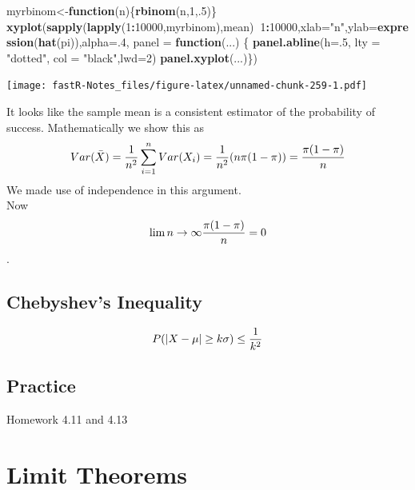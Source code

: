 \documentclass[]{book}
\newenvironment{Shaded}{\begin{snugshade}}{\end{snugshade}}
\newcommand{\KeywordTok}[1]{\textcolor[rgb]{0.13,0.29,0.53}{\textbf{#1}}}
\newcommand{\DataTypeTok}[1]{\textcolor[rgb]{0.13,0.29,0.53}{#1}}
\newcommand{\DecValTok}[1]{\textcolor[rgb]{0.00,0.00,0.81}{#1}}
\newcommand{\StringTok}[1]{\textcolor[rgb]{0.31,0.60,0.02}{#1}}
\newcommand{\ControlFlowTok}[1]{\textcolor[rgb]{0.13,0.29,0.53}{\textbf{#1}}}
\newcommand{\OperatorTok}[1]{\textcolor[rgb]{0.81,0.36,0.00}{\textbf{#1}}}
\newcommand{\NormalTok}[1]{#1}
\theoremstyle{definition}
\theoremstyle{definition}
\theoremstyle{definition}
\theoremstyle{remark}
\begin{document}
\begin{Shaded}
\begin{Highlighting}[]
\NormalTok{myrbinom<-}\ControlFlowTok{function}\NormalTok{(n)\{}\KeywordTok{rbinom}\NormalTok{(n,}\DecValTok{1}\NormalTok{,.}\DecValTok{5}\NormalTok{)\}}
\KeywordTok{xyplot}\NormalTok{(}\KeywordTok{sapply}\NormalTok{(}\KeywordTok{lapply}\NormalTok{(}\DecValTok{1}\OperatorTok{:}\DecValTok{10000}\NormalTok{,myrbinom),mean)}\OperatorTok{~}\DecValTok{1}\OperatorTok{:}\DecValTok{10000}\NormalTok{,}\DataTypeTok{xlab=}\StringTok{"n"}\NormalTok{,}\DataTypeTok{ylab=}\KeywordTok{expression}\NormalTok{(}\KeywordTok{hat}\NormalTok{(pi)),}\DataTypeTok{alpha=}\NormalTok{.}\DecValTok{4}\NormalTok{,}
       \DataTypeTok{panel =} \ControlFlowTok{function}\NormalTok{(...) \{}
         \KeywordTok{panel.abline}\NormalTok{(}\DataTypeTok{h=}\NormalTok{.}\DecValTok{5}\NormalTok{, }\DataTypeTok{lty =} \StringTok{"dotted"}\NormalTok{, }\DataTypeTok{col =} \StringTok{"black"}\NormalTok{,}\DataTypeTok{lwd=}\DecValTok{2}\NormalTok{)}
         \KeywordTok{panel.xyplot}\NormalTok{(...)\})}
\end{Highlighting}
\end{Shaded}

\texttt{[image: fastR-Notes\_files/figure-latex/unnamed-chunk-259-1.pdf]}

It looks like the sample mean is a consistent estimator of the
probability of success. Mathematically we show this as
\[Var(\bar{X})={1 \over n^{2}} \sum_{i=1}^{n}Var(X_{i}) = {1 \over n^{2}}(n\pi(1-\pi))={\pi(1-\pi) \over n}\]
We made use of independence in this argument.\\
Now \[\lim{n \to \infty}{\pi(1-\pi) \over n}=0\].

\subsection{Chebyshev's Inequality}\label{chebyshevs-inequality}

\[P(\vert X- \mu \vert \geq k \sigma) \leq {1 \over k^2}\]

\subsection{Practice}\label{practice-7}

Homework 4.11 and 4.13

\hypertarget{L20}{\section{Limit Theorems}\label{L20}}
\end{document}

